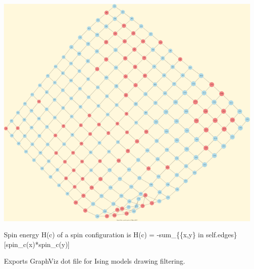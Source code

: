 \documentclass[letterpaper,10pt,english]{sphinxmanual}
\begin{document}
\begin{fulllineitems}
\begin{description}
\end{description}

{\hfill\includegraphics{grid-15-15-ising.png}\hfill}

\begin{fulllineitems}
\label{techDoc:graphs.IsingModel.computeSpinEnergy}
Spin energy H(c) of a spin configuration is
H(c) = -sum\_\{\{x,y\} in self.edges\}{[}spin\_c(x)*spin\_c(y){]}

\end{fulllineitems}


\begin{fulllineitems}
\label{techDoc:graphs.IsingModel.exportGraphViz}
Exports GraphViz dot file  for Ising models drawing filtering.

\end{fulllineitems}


\begin{fulllineitems}
\label{techDoc:graphs.IsingModel.generateSpinConfiguration}
\end{fulllineitems}


\end{fulllineitems}
\end{document}
